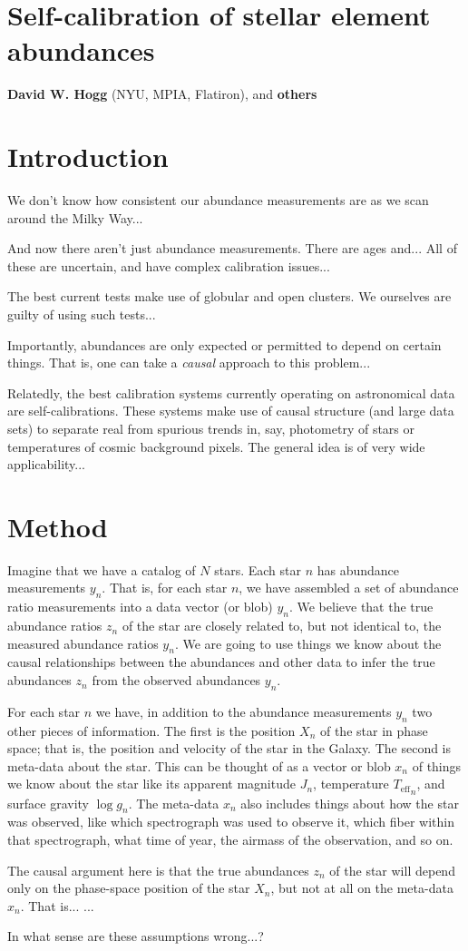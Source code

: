 \documentclass[12pt, letterpaper]{article}
\newcommand{\teff}{{T_{\mathrm{eff}}}}
\newcommand{\logg}{\log g}
\begin{document}
\sloppy\sloppypar\raggedbottom\frenchspacing

\section*{Self-calibration of stellar element abundances}
\noindent
\textbf{David W. Hogg} (NYU, MPIA, Flatiron), and \textbf{others}

\section{Introduction}
We don't know how consistent our abundance measurements are as we scan
around the Milky Way...

And now there aren't just abundance measurements.
There are ages and...
All of these are uncertain, and have complex calibration issues...

The best current tests make use of globular and open clusters.
We ourselves are guilty of using such tests...

Importantly, abundances are only expected or permitted to depend on certain
things.
That is, one can take a \emph{causal} approach to this problem...

Relatedly, the best calibration systems currently operating on astronomical
data are self-calibrations.
These systems make use of causal structure (and large data sets) to
separate real from spurious trends in, say, photometry of stars or
temperatures of cosmic background pixels.
The general idea is of very wide applicability...

\section{Method}
Imagine that we have a catalog of $N$ stars.
Each star $n$ has abundance measurements $y_n$.
That is, for each star $n$, we have assembled a set of abundance ratio
measurements into a data vector (or blob) $y_n$.
We believe that the true abundance ratios $z_n$ of the star are
closely related to, but not identical to, the measured abundance
ratios $y_n$.
We are going to use things we know about the causal relationships
between the abundances and other data to infer the true abundances
$z_n$ from the observed abundances $y_n$.

For each star $n$ we have, in addition to the abundance measurements
$y_n$ two other pieces of information.
The first is the position $X_n$ of the star in phase space; that is,
the position and velocity of the star in the Galaxy.
The second is meta-data about the star.
This can be thought of as a vector or blob $x_n$ of things we know
about the star like its apparent magnitude $J_n$, temperature
$\teff_n$, and surface gravity $\logg_n$.
The meta-data $x_n$ also includes things about how the star was
observed, like which spectrograph was used to observe it, which fiber
within that spectrograph, what time of year, the airmass of the
observation, and so on.

The causal argument here is that the true abundances $z_n$ of the star
will depend only on the phase-space position of the star $X_n$, but not at
all on the meta-data $x_n$.
That is...
...

In what sense are these assumptions wrong...?
\end{document}
